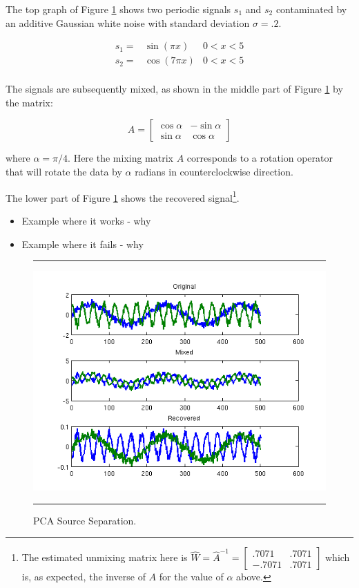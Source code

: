 \documentclass[11pt, oneside, a4paper]{report}
\begin{document}
The top graph of Figure \ref{pca_time_series} shows two periodic
signals $s_1$ and $s_2$ contaminated by an additive Gaussian white
noise with standard deviation $\sigma = .2$.


\begin{equation}
      \begin{array}{lll}
        s_1 = & \sin(\pi x) & 0<x<5\\
        s_2 = & \cos(7 \pi x) & 0<x<5\\
    \end{array}
\end{equation}

The signals are subsequently mixed, as shown in the middle part of
Figure \ref{pca_time_series} by the matrix:


\begin{equation}
  A = \begin{bmatrix} \cos \alpha & -\sin \alpha \\ \sin \alpha & \cos \alpha \end{bmatrix}
\end{equation}

where $\alpha = \pi/4$. Here the mixing matrix $A$ corresponds to a
rotation operator that will rotate the data by $\alpha$ radians in
counterclockwise direction. 


The lower part of Figure \ref{pca_time_series} shows the recovered
signal\footnote{The estimated unmixing matrix here is $\hat{W} =
  \hat{A}^{-1} = \begin{bmatrix} .7071 & .7071 \\ -.7071 &
    .7071 \end{bmatrix}$ which is, as expected, the inverse of $A$ for
  the value of $\alpha$ above.}.


\begin{itemize}
  \item Example where it works - why
  \item Example where it fails - why
\end{itemize}



\begin{figure}
  \centering
  \hrule
  \includegraphics[width = .9\textwidth]{Figures/pca_signal_time_series}
  \hrule
  \caption{PCA Source Separation.}
  \label{pca_time_series}
\end{figure}
\end{document}
